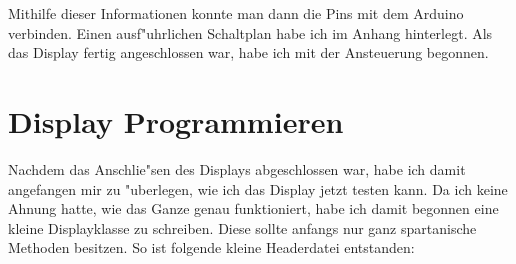 \documentclass[a4paper]{scrreprt}
\begin{document}
			Mithilfe dieser Informationen konnte man dann die Pins mit dem Arduino verbinden.
			Einen ausf"uhrlichen Schaltplan habe ich im Anhang hinterlegt. 
			Als das Display fertig angeschlossen war, habe ich mit der Ansteuerung begonnen.
			
		\section{Display Programmieren}	
			Nachdem das Anschlie"sen des Displays abgeschlossen war, habe ich damit angefangen
			mir zu "uberlegen, wie ich das Display jetzt testen kann. 
			Da ich keine Ahnung hatte, wie das Ganze genau funktioniert, habe ich damit begonnen
			eine kleine Displayklasse zu schreiben. Diese sollte anfangs nur ganz spartanische
			Methoden besitzen. So ist folgende kleine Headerdatei entstanden:
			
\end{document}
